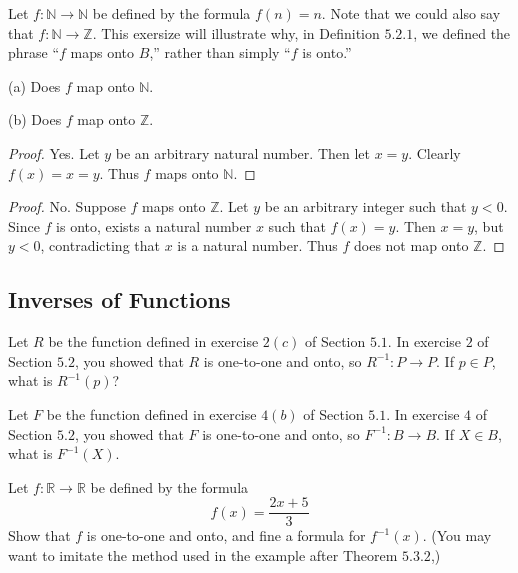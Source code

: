 \begin{tcolorbox}[title=Problem 23, breakable]
    Let $f : \mathbb{N} \rightarrow \mathbb{N}$ be defined by the formula $f(n) = n$.
    Note that we could also say that $f : \mathbb{N} \rightarrow \mathbb{Z}$.
    This exersize will illustrate why,
        in Definition $5.2.1$, we defined the phrase ``$f$ maps onto $B$,''
        rather than simply ``$f$ is onto.''

    (a) Does $f$ map onto $\mathbb{N}$.

    (b) Does $f$ map onto $\mathbb{Z}$.
\end{tcolorbox}

\begin{proof}
    Yes. Let $y$ be an arbitrary natural number. Then let $x = y$.
    Clearly $f(x) = x = y$. Thus $f$ maps onto $\mathbb{N}$.
\end{proof}

\begin{proof}
    No. Suppose $f$ maps onto $\mathbb{Z}$.
    Let $y$ be an arbitrary integer such that $y < 0$.
    Since $f$ is onto, exists a natural number $x$ such that $f(x) = y$.
    Then $x = y$, but $y < 0$, contradicting
    that $x$ is a natural number. Thus $f$ does not map onto $\mathbb{Z}$.
\end{proof}

\subsection{Inverses of Functions}

\begin{tcolorbox}[title=Problem 1, breakable]
    Let $R$ be the function defined in exercise $2(c)$ of Section $5.1$.
    In exercise $2$ of Section $5.2$, you showed that $R$ is one-to-one
    and onto, so $R^{-1} : P \rightarrow P$. If $p \in P$,
    what is $R^{-1}(p)$?
\end{tcolorbox}

\begin{tcolorbox}[title=Problem 2, breakable]
    Let $F$ be the function defined in exercise $4(b)$ of Section $5.1$.
    In exercise $4$ of Section $5.2$, you showed that $F$ is one-to-one 
    and onto, so $F^{-1} : B \rightarrow B$. If $X \in B$,
    what is $F^{-1}(X)$.
\end{tcolorbox}

\begin{tcolorbox}[title=Problem 3, breakable]
    Let $f : \mathbb{R} \rightarrow \mathbb{R}$ be defined by the formula 
    \[f(x) = \frac{2x + 5}{3}\]
    Show that $f$ is one-to-one and onto, and fine a formula for $f^{-1}(x)$.
    (You may want to imitate the method used in the example after Theorem $5.3.2$,)
\end{tcolorbox}

